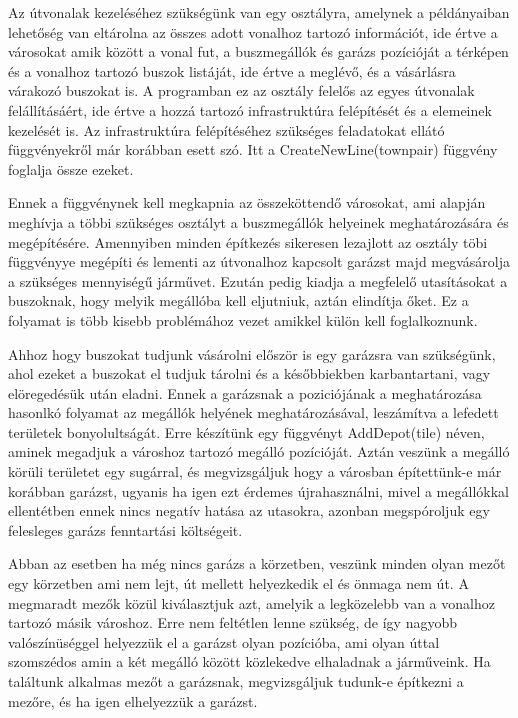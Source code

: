 Az útvonalak kezeléséhez szükségünk van egy osztályra, amelynek a példányaiban lehetőség van eltárolna az összes adott vonalhoz tartozó információt, ide értve a városokat amik között a vonal fut, a buszmegállók és garázs pozícióját a térképen és a vonalhoz tartozó buszok listáját, ide értve a meglévő, és a vásárlásra várakozó buszokat is. A programban ez az osztály felelős az egyes útvonalak felállításáért, ide értve a hozzá tartozó infrastruktúra felépítését és a elemeinek kezelését is. Az infrastruktúra felépítéséhez szükséges feladatokat ellátó függvényekről már korábban esett szó. Itt a CreateNewLine(townpair) függvény foglalja össze ezeket.

Ennek a függvénynek kell megkapnia az összeköttendő városokat, ami alapján meghívja a többi szükséges osztályt a buszmegállók helyeinek meghatározására és megépítésére. Amennyiben minden építkezés sikeresen lezajlott az osztály töbi függvényye megépíti és lementi az útvonalhoz kapcsolt garázst majd megvásárolja a szükséges mennyiségű járművet. Ezután pedig kiadja a megfelelő utasításokat a buszoknak, hogy melyik megállóba kell eljutniuk, aztán elindítja őket. Ez a folyamat is több kisebb problémához vezet amikkel külön kell foglalkoznunk.

Ahhoz hogy buszokat tudjunk vásárolni először is egy garázsra van szükségünk, ahol ezeket a buszokat el tudjuk tárolni és a későbbiekben karbantartani, vagy elöregedésük után eladni. Ennek a garázsnak a poziciójának a meghatározása hasonlkó folyamat az megállók helyének meghatározásával, leszámítva a lefedett területek bonyolultságát. Erre készítünk egy függvényt AddDepot(tile) néven, aminek megadjuk a városhoz tartozó megálló pozícióját. Aztán veszünk a megálló körüli területet egy sugárral, és megvizsgáljuk hogy a városban építettünk-e már korábban garázst, ugyanis ha igen ezt érdemes újrahasználni, mivel a megállókkal ellentétben ennek nincs negatív hatása az utasokra, azonban megspóroljuk egy felesleges garázs fenntartási költségeit.

Abban az esetben ha még nincs garázs a körzetben, veszünk minden olyan mezőt egy körzetben ami nem lejt, út mellett helyezkedik el és önmaga nem út. A megmaradt mezők közül kiválasztjuk azt, amelyik a legközelebb van a vonalhoz tartozó másik városhoz. Erre nem feltétlen lenne szükség, de így nagyobb valószínüséggel helyezzük el a garázst olyan pozícióba, ami olyan úttal szomszédos amin a két megálló között közlekedve elhaladnak a járműveink. Ha találtunk alkalmas mezőt a garázsnak, megvizsgáljuk tudunk-e építkezni a mezőre, és ha igen elhelyezzük a garázst.

